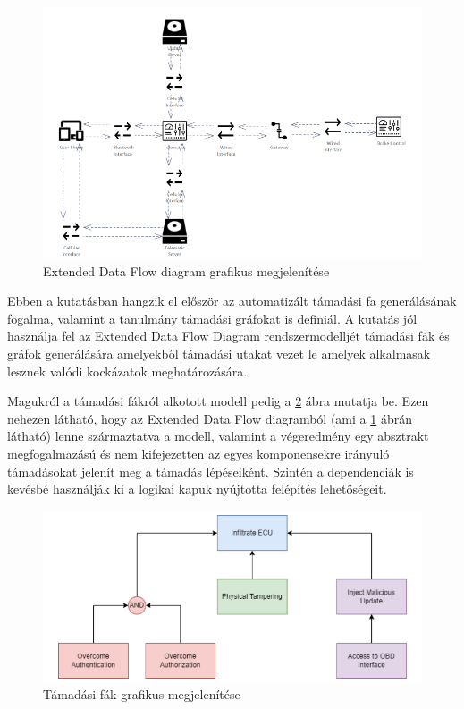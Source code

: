 \begin{figure}[!ht]
	\centering
	\includegraphics[width=125mm, keepaspectratio]{figures/03_CHULP_EDD.png}
	\caption{Extended Data Flow diagram grafikus megjelenítése\cite{Chulp}}
	\label{fig:CHULP_EDD}
\end{figure}

Ebben a kutatásban hangzik el először az automatizált támadási fa generálásának fogalma, valamint a tanulmány támadási gráfokat is definiál. A kutatás jól használja fel az Extended Data Flow Diagram rendszermodelljét támadási fák és gráfok generálására amelyekből támadási utakat vezet le amelyek alkalmasak lesznek valódi kockázatok meghatározására.

Magukról a támadási fákról alkotott modell pedig a \ref{fig:CHULP_AT} ábra mutatja be. Ezen nehezen látható, hogy az Extended Data Flow diagramból (ami a \ref{fig:CHULP_EDD} ábrán látható) lenne származtatva a modell, valamint a végeredmény egy absztrakt megfogalmazású és nem kifejezetten az egyes komponensekre irányuló támadásokat jelenít meg a támadás lépéseiként. Szintén a dependenciák is kevésbé használják ki a logikai kapuk nyújtotta felépítés lehetőségeit.

\begin{figure}[!ht]
	\centering
	\includegraphics[width=125mm, keepaspectratio]{figures/03_CHULP_AT.png}
	\caption{Támadási fák grafikus megjelenítése\cite{Chulp}}
	\label{fig:CHULP_AT}
\end{figure}

